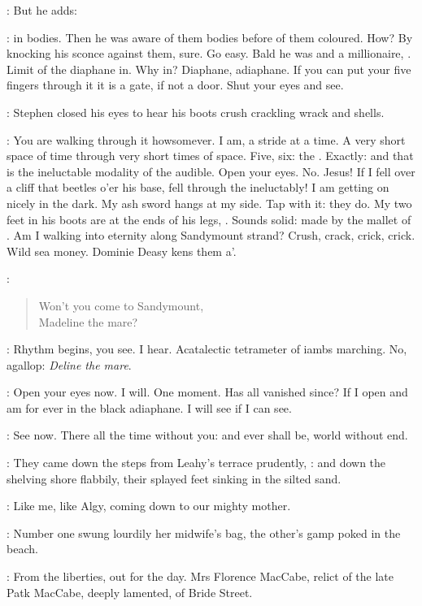 :
But he adds:

\StephenInt:
in bodies.
Then he was aware of them bodies before of them coloured.
How?
By knocking his sconce against them, sure.
Go easy.
Bald he was and a millionaire,
.
Limit of the diaphane in.
Why in?
Diaphane, adiaphane.
If you can put your five fingers through it it is a gate,
if not a door.
Shut your eyes and see.

:
Stephen closed his eyes to hear his boots
crush crackling wrack and shells.

\StephenInt:
You are walking through it howsomever.
I am, a stride at a time.
A very short space of time through very short times of space.
Five, six: the .
Exactly: and that is the ineluctable modality of the audible.
Open your eyes.
No.
Jesus!
If I fell over a cliff that beetles o'er his base,
fell through the  ineluctably!
I am getting on nicely in the dark.
My ash sword hangs at my side.
Tap with it: they do.
My two feet in his boots are at the ends of his legs, .
Sounds solid:
made by the mallet of .
Am I walking into eternity along Sandymount strand?
Crush, crack, crick, crick.
Wild sea money.
Dominie Deasy kens
them a'.

:
\begin{verse}
    Won't you come to Sandymount, \\
    Madeline the mare?
\end{verse}

\StephenInt:
Rhythm begins, you see.
I hear.
Acatalectic tetrameter of iambs marching.
No, agallop:
\emph{Deline the mare}.

\StephenInt:
Open your eyes now.
I will.
One moment.
Has all vanished since?
If I open and am for ever in the black adiaphane.
I will see if I can see.

\StephenInt:
See now.
There all the time without you:
and ever shall be,
world without end.

:
They came down the steps from Leahy's terrace prudently,
:
and down the shelving shore flabbily,
their splayed feet sinking in the silted sand.

\StephenInt:
Like me, like Algy,
coming down to our mighty mother.

:
Number one swung lourdily her midwife's bag,
the other's gamp poked in the beach.

:
From the liberties, out for the day.
Mrs Florence MacCabe,
relict of the late Patk MacCabe, deeply lamented,
of Bride Street.


